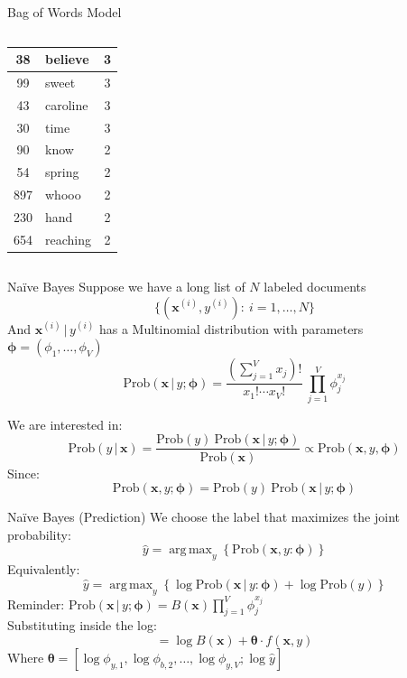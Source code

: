 \documentclass[handout]{beamer}
\newcommand{\Prob}{\text{Prob}}
\newcommand{\bx}{\mathbf{x}}
\newcommand{\bphi}{\pmb{\phi}}
\newcommand{\btheta}{\pmb{\theta}}
\newcommand{\given}{\, | \,}
\DeclareMathOperator*{\argmax}{arg\,max}
\begin{document}
\begin{frame}{Bag of Words Model}
\begin{columns}[T]
\begin{column}{0.4\textwidth}
\begin{tabular}{|c|l|c|}
                \hline
                38 & believe&3\\
                \hline
                99 & sweet&3\\
                \hline
                43 & caroline&3\\
                \hline
                30 & time&3\\
                \hline
                90 &know&2\\
                \hline
                54& spring&2\\
                \hline
                897& whooo&2\\
                \hline
                230 & hand&2\\
                \hline
                654 & reaching&2\\
                \hline
            \end{tabular}
        \end{column}
    \end{columns}
\end{frame}

\begin{frame}{Na\"ive Bayes}
    Suppose we have a long list of $N$ labeled documents $$\{(\bx^{(i)},y^{(i)}) :\ i = 1,\ldots, N \}$$
        And $\bx^{(i)}\given y^{(i)} $ has a Multinomial distribution with parameters $\bphi = (\phi_1,\ldots, \phi_V)$ 
        $$\Prob(\bx\given y;\bphi) = \frac{(\sum_{j=1}^V x_j)!}{x_1!\cdots x_V!}\  \prod_{j=1}^V \phi_j^{x_j}$$

        We are interested in:
        $$\Prob(y\given \bx) = \frac{\Prob(y)\  \Prob(\bx \given y; \bphi)}{\Prob(\bx)}\propto \Prob(\bx, y,\bphi)$$
        Since:
        $$\Prob(\bx,y; \bphi) = \Prob(y) \ \Prob(\bx \given y; \bphi)$$

\end{frame}


\begin{frame}{Na\"ive Bayes (Prediction)}
     We choose the label that maximizes the joint probability:
     $$\hat y = \argmax_y\left\{ \Prob(\bx, y: \bphi)\right \}$$
     Equivalently:
     $$\hat y = \argmax_y\left\{ \log \Prob(\bx\given y: \bphi) + \log\Prob(y)\right\}$$
     {\color{green}Reminder:} $\displaystyle \Prob(\bx\given y;\bphi) = B(\bx) \prod_{j=1}^V \phi_j^{x_j}$\\
     Substituting inside the log:
     $$= \log B(\bx) + \btheta\cdot f(\bx, y)$$
    Where $\btheta = [\log \phi_{y,1}, \log \phi_{b,2} ,\ldots , \log \phi_{y,V}; \log \hat y]$
\end{frame}
\end{document}
